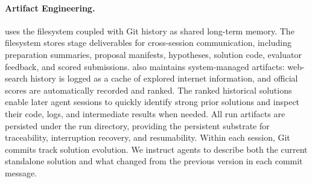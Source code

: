 \documentclass{article} %
\begin{document}
   \paragraph{Artifact Engineering.}
   \method uses the filesystem coupled with Git history as shared long-term memory. 
   The filesystem stores stage deliverables for 
   cross-session communication, including preparation summaries, proposal manifests, hypotheses, solution code, evaluator feedback, and scored submissions. 
   \method also maintains system-managed artifacts: web-search history is logged as a cache of explored internet information, and official scores are automatically recorded and ranked.
   The ranked historical solutions enable later agent sessions to quickly identify strong prior solutions and inspect their code, logs, and intermediate results when needed. 
   All run artifacts are persisted under the run directory, providing the persistent substrate for traceability, interruption recovery, and resumability. 
   Within each session, Git commits track solution evolution. 
   We instruct agents to describe both the current standalone solution and what changed from the previous version in each commit message.
   
\end{document}

